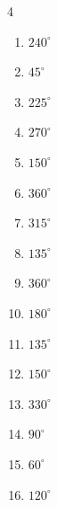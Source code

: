 \begin{multicols}{4}
\begin{enumerate}
  \item $\displaystyle 240^{\circ}$

\columnbreak %

  \item $\displaystyle 45^{\circ}$

  \item $\displaystyle 225^{\circ}$

  \item $\displaystyle 270^{\circ}$

  \item $\displaystyle 150^{\circ}$

  \item $\displaystyle 360^{\circ}$
        \phantom{$\displaystyle =2\pi$}

  \item $\displaystyle 315^{\circ}$

  \item $\displaystyle 135^{\circ}$

  \item $\displaystyle 360^{\circ}$
        \phantom{$\displaystyle =2\pi$}

  \item $\displaystyle 180^{\circ}$
        \phantom{$\displaystyle =\pi$}

  \item $\displaystyle 135^{\circ}$

  \item $\displaystyle 150^{\circ}$

  \item $\displaystyle 330^{\circ}$

  \item $\displaystyle 90^{\circ}$

  \item $\displaystyle 60^{\circ}$

  \item $\displaystyle 120^{\circ}$


\end{enumerate}
\end{multicols}
